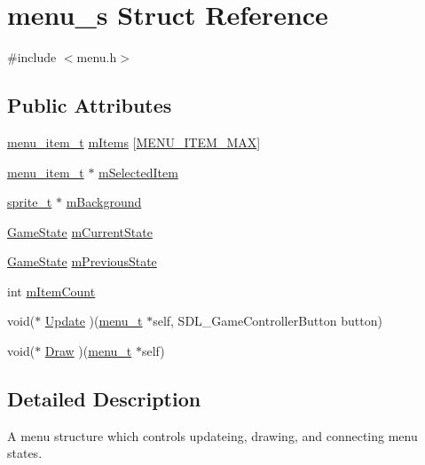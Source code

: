 \hypertarget{structmenu__s}{}\section{menu\+\_\+s Struct Reference}
\label{structmenu__s}


{\ttfamily \#include $<$menu.\+h$>$}

\subsection*{Public Attributes}
\begin{DoxyCompactItemize}
\item 
\hyperlink{menu_8h_affefd3de0ee32201a1e405b126d4a8dd}{menu\+\_\+item\+\_\+t} \hyperlink{structmenu__s_a6a7f46ad3a4345af651ed2bc3825d305}{m\+Items} \mbox{[}\hyperlink{menu_8h_ab4ca22b3abeffba22f56886bbb39c0f9}{M\+E\+N\+U\+\_\+\+I\+T\+E\+M\+\_\+\+M\+AX}\mbox{]}
\item 
\hyperlink{menu_8h_affefd3de0ee32201a1e405b126d4a8dd}{menu\+\_\+item\+\_\+t} $\ast$ \hyperlink{structmenu__s_a40269f7846734c2bf745d089a2b71f25}{m\+Selected\+Item}
\item 
\hyperlink{graphics_8h_a5371414b10358aeda7c6bcec8196342f}{sprite\+\_\+t} $\ast$ \hyperlink{structmenu__s_a570575b24118365068e8cffbadff7186}{m\+Background}
\item 
\hyperlink{globals_8h_a7899b65f1ea0f655e4bbf8d2a5714285}{Game\+State} \hyperlink{structmenu__s_a6a6fc8c2b6fc9274e2d7275d8fd84f3d}{m\+Current\+State}
\item 
\hyperlink{globals_8h_a7899b65f1ea0f655e4bbf8d2a5714285}{Game\+State} \hyperlink{structmenu__s_aa701766eb0f926ab2e7d1e2a17e93a7e}{m\+Previous\+State}
\item 
int \hyperlink{structmenu__s_a44d944be8c2648968407c31a0aef4494}{m\+Item\+Count}
\item 
void($\ast$ \hyperlink{structmenu__s_aa49d774f3511e81ba1ea31a92378abf7}{Update} )(\hyperlink{menu_8h_aed08c6d5d5b5d87ad2368f169239217c}{menu\+\_\+t} $\ast$self, S\+D\+L\+\_\+\+Game\+Controller\+Button button)
\item 
void($\ast$ \hyperlink{structmenu__s_aa936a66917d20b02b67ac685d49c6eaf}{Draw} )(\hyperlink{menu_8h_aed08c6d5d5b5d87ad2368f169239217c}{menu\+\_\+t} $\ast$self)
\end{DoxyCompactItemize}


\subsection{Detailed Description}
A menu structure which controls updateing, drawing, and connecting menu states.

